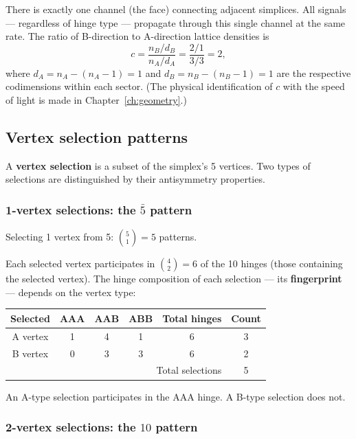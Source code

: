 \documentclass[12pt]{article}
\theoremstyle{remark}
\theoremstyle{definition}
\begin{document}
There is exactly one channel (the face) connecting adjacent simplices. All signals --- regardless of hinge type --- propagate through this single channel at the same rate. The ratio of B-direction to A-direction lattice densities is
\begin{equation}
c = \frac{n_B / d_B}{n_A / d_A} = \frac{2/1}{3/3} = 2,
\label{eq:c_geometric}
\end{equation}
where $d_A = n_A - (n_A - 1) = 1$ and $d_B = n_B - (n_B - 1) = 1$ are the respective codimensions within each sector. (The physical identification of $c$ with the speed of light is made in Chapter~\ref{ch:geometry}.)

\subsection{Vertex selection patterns}
\label{sec:fermion_combinatorics}

A \textbf{vertex selection} is a subset of the simplex's 5 vertices. Two types of selections are distinguished by their antisymmetry properties.

\subsubsection{1-vertex selections: the $\bar{5}$ pattern}

Selecting 1 vertex from 5: $\binom{5}{1} = 5$ patterns.

Each selected vertex participates in $\binom{4}{2} = 6$ of the 10 hinges (those containing the selected vertex). The hinge composition of each selection --- its \textbf{fingerprint} --- depends on the vertex type:

\begin{center}
\begin{tabular}{cccccc}
\hline
Selected & AAA & AAB & ABB & Total hinges & Count \\
\hline
A vertex & 1 & 4 & 1 & 6 & 3 \\
B vertex & 0 & 3 & 3 & 6 & 2 \\
\hline
\multicolumn{5}{r}{Total selections} & 5 \\
\hline
\end{tabular}
\end{center}

An A-type selection participates in the AAA hinge. A B-type selection does not.

\subsubsection{2-vertex selections: the $10$ pattern}
\end{document}
